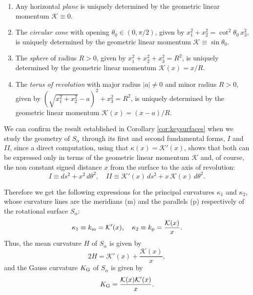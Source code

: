 \documentclass[leqno,11pt]{amsart}
\theoremstyle{definition}
\numberwithin{equation}{section}
\begin{document}
\begin{enumerate}
	\item Any horizontal \textit{plane} is uniquely determined by the geometric linear momentum $\mathcal K \equiv 0$.
	\item The \textit{circular cone} with opening $\theta_0 \in (0, \pi/2)$, given by $x_1^2+x_2^2=\cot^2\theta_0\,x_3^2$, is uniquely determined by the geometric linear momentum $\mathcal K \equiv \sin \theta_0$.
	\item The \textit{sphere} of radius $R>0$, given by $x_1^2+x_2^2+x_3^2=R^2$, is uniquely determined by the geometric linear momentum $\mathcal K (x)=x/R$.
	\item The \textit{torus of revolution} with major radius $|a|\neq 0$ and minor radius $R>0$, given by $(\sqrt{x_1^2+x_2^2}-a)^2+x_3^2=R^2$, is uniquely determined by the geometric linear momentum  $\mathcal K (x)=(x-a)/R$.
\end{enumerate}

We can confirm the result established in Corollary \ref{cor:keysurfaces} when we study the geometry of $S_\alpha$ through its first and second fundamental forms, $I$ and $II$, since a direct computation, using that $\kappa (x)=\mathcal K ' (x) $, shows that both can be expressed only in terms of the geometric linear momentum $\mathcal K$ and, of course, the non constant signed distance $x$ from the surface to the axis of revolution:
$$ I\equiv ds^2 + x^2 \, d\theta ^2, \quad II\equiv \mathcal K ' (x) \, ds^2 + x \, \mathcal K (x) \, d\theta^2. $$

Therefore we get the following expressions for the principal curvatures $\kappa_1$ and $\kappa_2$, whose curvature lines are the meridians (m) and the parallels (p) respectively of the rotational surface $S_\alpha$:
\begin{equation}\label{eq:prin curv}
	\kappa_1\equiv k_{\text m}= \mathcal K ' (x), \quad \kappa_2\equiv k_{\text p}= \frac{\mathcal K (x)}{x}.
\end{equation}
Thus, the mean curvature $H$ of $S_\alpha $ is given by
\begin{equation}\label{eq:H}
	2H=\mathcal K ' (x)+\frac{\mathcal K (x)}{x},
\end{equation}
and the Gauss curvature $K_{\text G}$ of $S_\alpha $ is given by
\begin{equation}\label{eq:KGauss}
	K_{\text G}=\frac{\mathcal K (x) \mathcal K ' (x) }{x}.
\end{equation}
\end{document}
